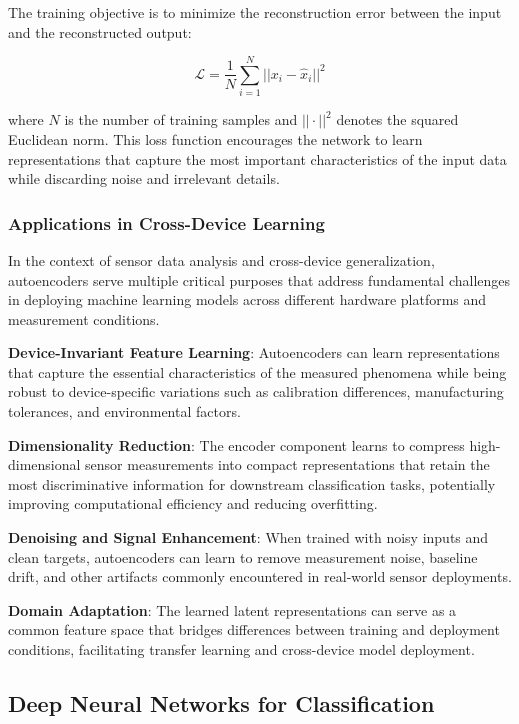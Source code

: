 The training objective is to minimize the reconstruction error between the input and the reconstructed output:

\begin{equation}
\mathcal{L} = \frac{1}{N} \sum_{i=1}^{N} ||x_i - \hat{x}_i||^2
\end{equation}

where $N$ is the number of training samples and $||\cdot||^2$ denotes the squared Euclidean norm. This loss function encourages the network to learn representations that capture the most important
characteristics of the input data while discarding noise and irrelevant details.

\subsubsection{Applications in Cross-Device Learning}

In the context of sensor data analysis and cross-device generalization, autoencoders serve multiple critical purposes that address fundamental challenges in deploying machine learning models
across different hardware platforms and measurement conditions.

\textbf{Device-Invariant Feature Learning}: Autoencoders can learn representations that capture the essential characteristics of the measured phenomena while being robust to device-specific
variations such as calibration differences, manufacturing tolerances, and environmental factors.

\textbf{Dimensionality Reduction}: The encoder component learns to compress high-dimensional sensor measurements into compact representations that retain the most discriminative information for
downstream classification tasks, potentially improving computational efficiency and reducing overfitting.

\textbf{Denoising and Signal Enhancement}: When trained with noisy inputs and clean targets, autoencoders can learn to remove measurement noise, baseline drift, and other artifacts commonly
encountered in real-world sensor deployments.

\textbf{Domain Adaptation}: The learned latent representations can serve as a common feature space that bridges differences between training and deployment conditions, facilitating transfer
learning and cross-device model deployment.

\subsection{Deep Neural Networks for Classification}

